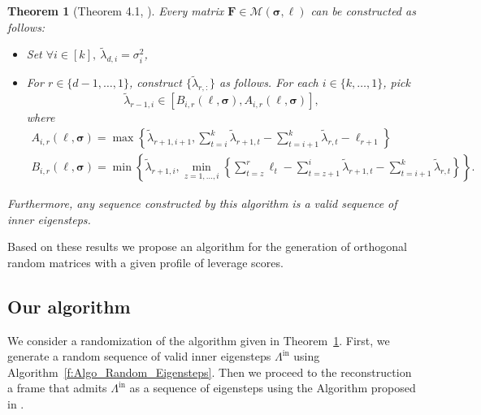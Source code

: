 \documentclass[twoside,11pt]{book}
\newtheorem{theorem}{Theorem}
\numberwithin{theorem}{chapter}
\numberwithin{definition}{chapter}
\numberwithin{proposition}{chapter}
\numberwithin{corollary}{chapter}
\numberwithin{example}{chapter}
\numberwithin{lemma}{chapter}
\numberwithin{assumption}{chapter}
\numberwithin{equation}{chapter}
\numberwithin{figure}{chapter}
\begin{document}
\begin{subappendices}
\begin{theorem}[Theorem 4.1, \citealp{FMPS13}]\label{thm:parametrization_of_polytope}
Every matrix $\bm{F}\in\mathcal{M}({\bm{\sigma},\bm{\ell}})$ can be constructed as follows:
\begin{itemize}
    \item Set $\forall i \in [k], \: \tilde\lambda_{d,i} = \sigma_{i}^2$,
    \item For $r \in \{d-1, \dots, 1 \}$, construct $\{\tilde\lambda_{r,:}\}$ as follows. For each $i \in \{k, \dots , 1\}$, pick $$\tilde\lambda_{r-1,i} \in [B_{i,r}(\bm{\ell},\bm{\sigma}),A_{i,r}(\bm{\ell},\bm{\sigma})],$$ where
    \begin{equation}
    \begin{split}
      A_{i,r}(\bm{\ell},\bm{\sigma}) = \max \left\{\tilde\lambda_{r+1,i+1}, \sum\limits_{t = i}^{k}\tilde\lambda_{r+1,t} - \sum\limits_{t = i+1}^{k}\tilde\lambda_{r,t} - \ell_{r+1} \right\}\\
      B_{i,r}(\bm{\ell},\bm{\sigma}) = \min \left\{\tilde\lambda_{r+1,i}, \min\limits_{z = 1,\dots,i} \left\{\sum\limits_{t=z}^{r}\ell_{t} - \sum\limits_{t=z+1}^{i}\tilde\lambda_{r+1,t} - \sum\limits_{t=i+1}^{k}\tilde\lambda_{r,t}\right\} \right\}.
    \end{split}
    \end{equation}
  \end{itemize}
Furthermore, any sequence constructed by this algorithm is a valid sequence of inner eigensteps.
\end{theorem}

Based on these results we propose an algorithm for the generation of orthogonal random matrices with a given profile of leverage scores.

\subsection{Our algorithm}
We consider a randomization of the algorithm given in Theorem~\ref{thm:parametrization_of_polytope}.
First, we generate a random sequence of valid inner eigensteps $\Lambda^{\text{in}}$ using Algorithm~\ref{f:Algo_Random_Eigensteps}. Then we proceed to the reconstruction a frame that admits $\Lambda^{\text{in}}$ as a sequence of eigensteps using the Algorithm proposed in \citep{FiMiPo11}.


\end{subappendices}
\end{document}
